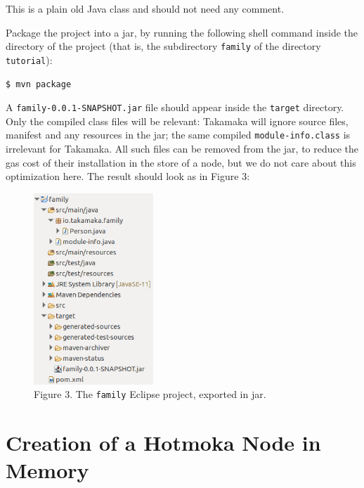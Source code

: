 \documentclass[a4paper,]{book}
\begin{document}
{This is a plain old Java class and should not need any comment.

Package the project into a jar, by running the following shell command
inside the directory of the project (that is, the subdirectory
\texttt{family} of the directory \texttt{tutorial}):

\begin{myverbatim}
\begin{verbatim}
$ mvn package
\end{verbatim}
\end{myverbatim}

A \texttt{family-0.0.1-SNAPSHOT.jar} file should appear inside the
\texttt{target} directory. Only the compiled class files will be
relevant: Takamaka will ignore source files, manifest and any resources
in the jar; the same compiled \texttt{module-info.class} is irrelevant
for Takamaka. All such files can be removed from the jar, to reduce the
gas cost of their installation in the store of a node, but we do not
care about this optimization here. The result should look as in Figure
3:

\begin{figure}
\centering
\includegraphics[width=0.4\textwidth,height=\textheight]{pics/family_jar.png}
\caption{Figure 3. The \texttt{family} Eclipse project, exported in
jar.}
\end{figure}

\hypertarget{creation-of-a-hotmoka-node-in-memory}{%
\section{Creation of a Hotmoka Node in Memory
}\label{creation-of-a-hotmoka-node-in-memory}}

}
\end{document}
